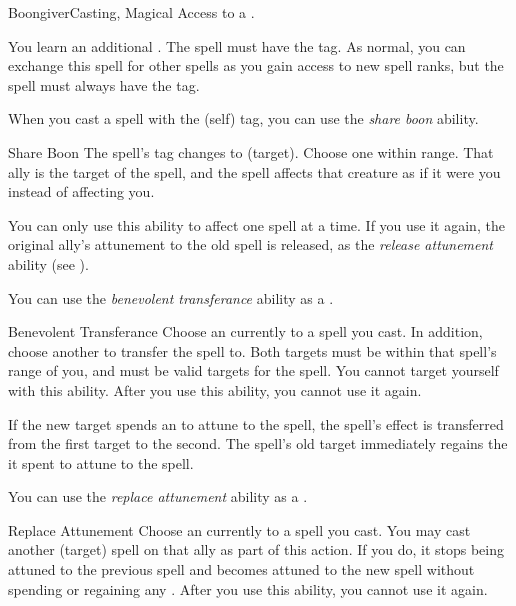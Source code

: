     \begin{feat}{Boongiver}{Casting, Magical}
        \featpre Access to a .

         You learn an additional .
        The spell must have the  tag.
        As normal, you can exchange this spell for other spells as you gain access to new spell ranks, but the spell must always have the  tag.

         When you cast a spell with the  (self) tag, you can use the \textit{share boon} ability.
        \begin{durationability}{Share Boon}
            The spell's  tag changes to  (target).
            Choose one  within \rngmed range.
            That ally is the target of the spell, and the spell affects that creature as if it were you instead of affecting you.

            You can only use this ability to affect one spell at a time.
            If you use it again, the original ally's attunement to the old spell is released, as the \textit{release attunement} ability (see ).
        \end{durationability}

         You can use the \textit{benevolent transferance} ability as a .
        \begin{instantability}{Benevolent Transferance}
            \rankline
            Choose an  currently  to a spell you cast.
            In addition, choose another  to transfer the spell to.
            Both targets must be within that spell's range of you, and must be valid targets for the spell.
            You cannot target yourself with this ability.
            After you use this ability, you  cannot use it again.

            If the new target spends an  to attune to the spell, the spell's effect is transferred from the first target to the second.
            The spell's old target immediately regains the  it spent to attune to the spell.
        \end{instantability}

         You can use the \textit{replace attunement} ability as a .
        \begin{instantability}{Replace Attunement}
            Choose an  currently  to a spell you cast.
            You may cast another  (target) spell on that ally as part of this action.
            If you do, it stops being attuned to the previous spell and becomes attuned to the new spell without spending or regaining any .
            After you use this ability, you  cannot use it again.
        \end{instantability}


\end{feat}
